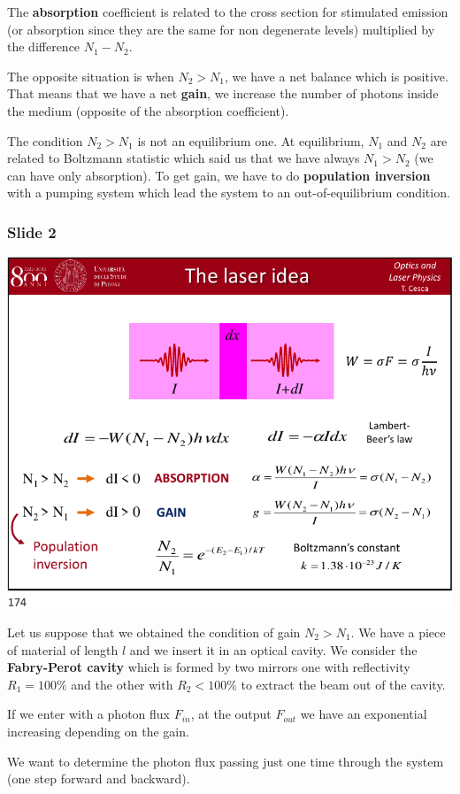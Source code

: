 \documentclass[../main/main.tex]{subfiles}
\begin{document}
The \textbf{absorption} coefficient is related to the cross section for stimulated emission (or absorption since they are the same for non degenerate levels) multiplied by the difference \( N_1 - N_2 \).

The opposite situation is when \( N_2 > N_1 \), we have a net balance which is positive. That means that we have a net \textbf{gain}, we increase the number of photons inside the medium (opposite of the absorption coefficient).

The condition \( N_2 > N_1 \) is not an equilibrium one. At equilibrium, \( N_1 \) and \( N_2 \) are related to Boltzmann statistic which said us that we have always \( N_1 > N_2 \) (we can have only absorption). To get gain, we have to do \textbf{population inversion} with a pumping system which lead the system to an out-of-equilibrium condition.

\subsubsection*{Slide 2}

\begin{minipage}[]{0.5\linewidth}
\centering
\includegraphics[page=2,width=1\textwidth]{../lessons/pdf_file/09_lecture.pdf}
\end{minipage}
\hspace{0.3cm}\vspace{0.3cm}
\begin{minipage}[c]{0.47\linewidth}

Let us suppose that we obtained the condition of gain \( N_2 > N_1 \). We have a piece of material of length \( l \) and we insert it in an optical cavity. We consider the \textbf{Fabry-Perot cavity} which is formed by two mirrors one with reflectivity \( R_1 = 100 \% \) and the other with \( R_2 < 100 \% \) to extract the beam out of the cavity.

If we enter with a photon flux \( F_{in} \), at the output \( F_{out} \) we have an exponential increasing depending on the gain.

We want to determine the photon flux passing just one time through the system (one step forward and backward).

\end{minipage}
\end{document}
